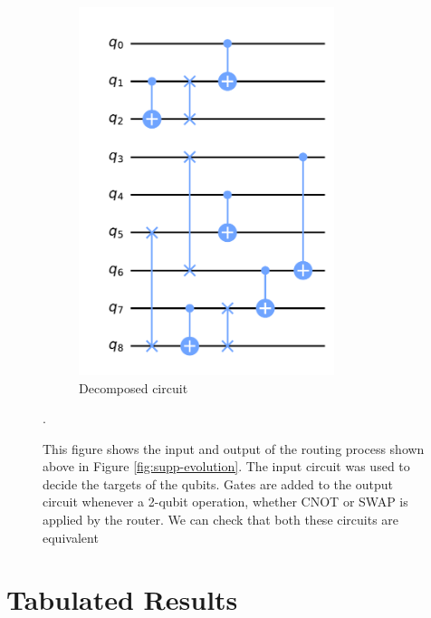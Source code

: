 \begin{figure}[ht]
\begin{subfigure}[b]{0.38\linewidth}
        \includegraphics[width=0.82\textwidth]{figures/qroute/supp_circuit_final.pdf}
        \caption{Decomposed circuit\label{fig:appendix-sliced_circ}}
    \end{subfigure}
    \hfill
    \caption[The transformed circuit output from qRoute]{This figure shows the input and output of the routing process shown above in Figure \ref{fig:supp-evolution}. The input circuit was used to decide the targets of the qubits. Gates are added to the output circuit whenever a 2-qubit operation, whether CNOT or SWAP is applied by the router. We can check that both these circuits are equivalent}.
    \label{fig:appendix-routing-example}
\end{figure}

\newpage

\section{Tabulated Results}

